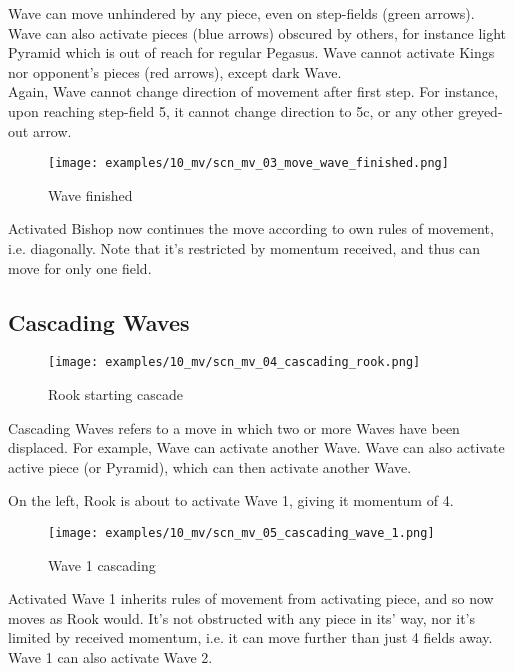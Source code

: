 Wave can move unhindered by any piece, even on step-fields (green arrows). Wave
can also activate pieces (blue arrows) obscured by others, for instance light
Pyramid which is out of reach for regular Pegasus. Wave cannot activate Kings nor 
opponent's pieces (red arrows), except dark Wave. \\
Again, Wave cannot change direction of movement after first step. For instance, 
upon reaching step-field 5, it cannot change direction to 5c, or any other 
greyed-out arrow.

\clearpage %

\noindent
\begin{figure}[h]
\texttt{[image: examples/10\_mv/scn\_mv\_03\_move\_wave\_finished.png]}
\caption{Wave finished}
\label{fig:scn_mv_03_move_wave_finished}
\end{figure}

Activated Bishop now continues the move according to own rules of movement,
i.e. diagonally. Note that it's restricted by momentum received, and thus
can move for only one field.

\clearpage %

\subsection*{Cascading Waves}

\noindent
\begin{wrapfigure}[13]{l}{0.5625\textwidth}
\centering
\texttt{[image: examples/10\_mv/scn\_mv\_04\_cascading\_rook.png]}
\caption{Rook starting cascade}
\label{fig:scn_mv_04_cascading_rook}
\end{wrapfigure}
Cascading Waves refers to a move in which two or more Waves have been displaced.
For example, Wave can activate another Wave. Wave can also activate active
piece (or Pyramid), which can then activate another Wave.

On the left, Rook is about to activate Wave 1, giving it momentum of 4.

\vspace*{0.05\textheight}
\noindent
\begin{wrapfigure}[12]{r}{0.5625\textwidth}
\centering
\texttt{[image: examples/10\_mv/scn\_mv\_05\_cascading\_wave\_1.png]}
\caption{Wave 1 cascading}
\label{fig:scn_mv_05_cascading_wave_1}
\end{wrapfigure}
Activated Wave 1 inherits rules of movement from activating piece, and so now
moves as Rook would. It's not obstructed with any piece in its' way, nor it's
limited by received momentum, i.e. it can move further than just 4 fields away.
Wave 1 can also activate Wave 2.

